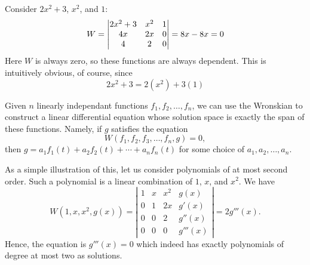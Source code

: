 \documentclass[12pt]{article}
\begin{document}
Consider $2x^2+3$, $x^2$, and $1$:
\[
W = \left\lvert\begin{array}{@{}ccc@{}}
2x^2 + 3 & x^2 & 1\\
4x & 2x & 0\\
4 & 2 & 0\\
\end{array}\right\rvert = 8x - 8x = 0
\]
Here $W$ is always zero, so these functions are always dependent. This is intuitively obvious, of course, since
\[
2x^2 + 3 = 2(x^2) + 3(1)
\]

Given $n$ linearly independant functions $f_1, f_2, \dotsc, f_n$, we can use 
the Wronskian to construct a linear differential equation whose solution space
is exactly the span of these functions.  Namely, if $g$ satisfies the equation
\[
W(f_1, f_2, f_3, \dotsc, f_n, g) = 0,
\]
then $g = a_1 f_1(t) + a_2 f_2(t) + \dotsb + a_n f_n(t)$ for some choice of
$a_1, a_2, \dotsc, a_n$.

As a simple illustration of this, let us consider polynomials of at most second order.  Such a polynomial is a linear combination of $1$, $x$, and $x^2$.  We
have 
\[ W (1, x, x^2, g(x)) = \left| \begin{matrix} 1 & x & x^2 & g(x) \\
0 & 1 & 2x & g'(x) \\ 0 & 0 & 2 & g''(x) \\ 0 & 0 & 0 & g'''(x)
\end{matrix} \right| = 2 g''' (x) .\]
Hence, the equation is $g''' (x) = 0$ which indeed has exactly polynomials
of degree at most two as solutions.
\end{document}

